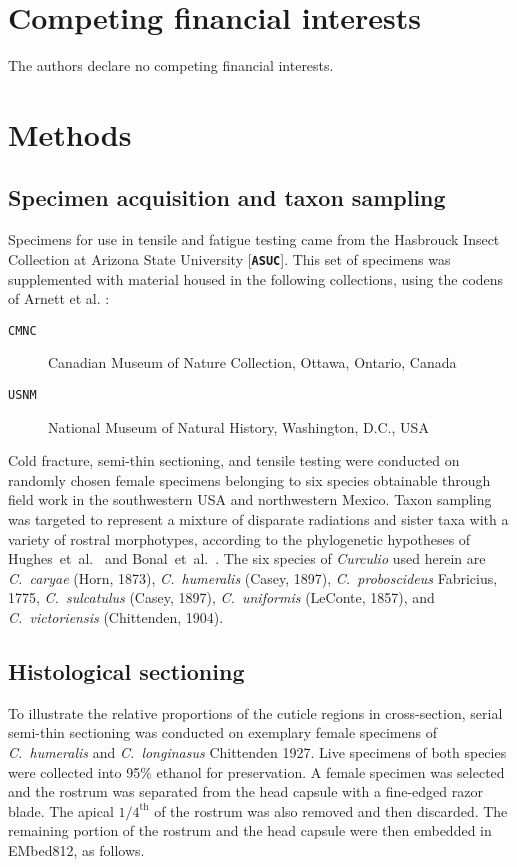 \documentclass[twocolumn, linenumbers, superscriptaddress, nofootinbib]{revtex4-1}
\begin{document}
	\section*{Competing financial interests}
		The authors declare no competing financial interests.
	
	\newpage

	\section*{Methods}
		\subsection*{Specimen acquisition and taxon sampling}
			Specimens for use in tensile and fatigue testing came from the Hasbrouck Insect Collection at Arizona State University [\textbf{\texttt{ASUC}}].  This set of specimens was supplemented with material housed in the following collections, using the codens of Arnett et al. \cite{Arnett1993}:
			
			\begin{description}
				\item [\texttt{CMNC}]  Canadian Museum of Nature Collection, Ottawa, Ontario, Canada
				\item [\texttt{USNM}]  National Museum of Natural History, Washington, D.C., USA
			\end{description}
		
			Cold fracture, semi-thin sectioning, and tensile testing were conducted on randomly chosen female specimens belonging to six species obtainable through field work in the southwestern USA and northwestern Mexico.
			Taxon sampling was targeted to represent a mixture of disparate radiations and sister taxa with a variety of rostral morphotypes, according to the phylogenetic hypotheses of Hughes~et~al.~\cite{Hughes2004eco, Hughes2004phylo} and Bonal~et~al.~\cite{Bonal2016}.
			The six species of \textit{Curculio} used herein are \textit{C.~caryae} (Horn, 1873), \textit{C.~humeralis} (Casey, 1897), \textit{C.~proboscideus} Fabricius, 1775, \textit{C.~sulcatulus} (Casey, 1897), \textit{C.~uniformis} (LeConte, 1857), and \textit{C.~victoriensis} (Chittenden, 1904).
	
		\subsection*{Histological sectioning}
			To illustrate the relative proportions of the cuticle regions in cross-section, serial semi-thin sectioning was conducted on exemplary female specimens of \textit{C.~humeralis} and \textit{C.~longinasus} Chittenden 1927.
			Live specimens of both species were collected into 95\% ethanol for
			preservation.
			A female specimen was selected and the rostrum was separated from the head capsule with a fine-edged razor blade.
			The apical $1/4^{\text{th}}$ of	the rostrum was also removed and then discarded.
			The remaining portion	of the rostrum and the head capsule were then embedded in EMbed812, as follows.
			
\end{document}
